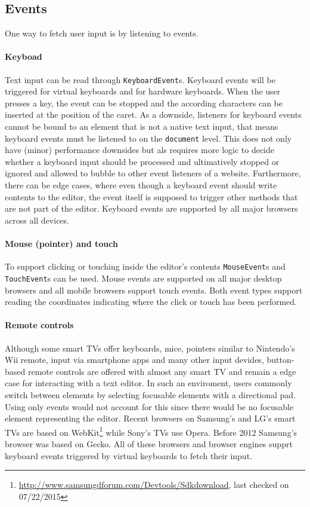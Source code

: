 \subsection{Events} 

One way to fetch user input is by listening to events.

\paragraph{Keyboad} Text input can be read through \texttt{KeyboardEvent}s. Keyboard events will be triggered for virtual keyboards and for hardware keyboards. When the user presses a key, the event can be stopped and the according characters can be inserted at the position of the caret. As a downside, listeners for keyboard events cannot be bound to an element that is not a native text input, that means keyboard events must be listened to on the \texttt{document} level. This does not only have (minor) performance downsides but als requires more logic to decide whether a keyboard input should be processed and ultimatively stopped or ignored and allowed to bubble to other event listeners of a website. Furthermore, there can be edge cases, where even though a keyboard event should write contents to the editor, the event itself is supposed to trigger other methods that are not part of the editor. Keyboard events are supported by all major browsers across all devices.

\paragraph{Mouse (pointer) and touch} To support clicking or touching inside the editor's contents \texttt{MouseEvent}s and \texttt{TouchEvent}s can be used. Mouse events are supported on all major desktop browsers and all mobile browsers support touch events. Both event types support reading the coordinates indicating where the click or touch has been performed.

\paragraph{Remote controls} Although some smart TVs offer keyboards, mice, pointers similar to Nintendo's Wii remote, input via smartphone apps and many other input devides, button-based remote controls are offered with almost any smart TV and remain a edge case for interacting with a text editor. In such an enviroment, users commonly switch between elements by selecting focusable elements with a directional pad. Using only events would not account for this since there would be no focusable element representing the editor. Recent browsers on Samsung's and LG's smart TVs are based on WebKit\footnote{\url{http://www.samsungdforum.com/Devtools/Sdkdownload}, last checked on 07/22/2015} while Sony's TVs use Opera. Before 2012 Samsung's browser was based on Gecko. All of these browsers and browser engines supprt keyboard events triggered by virtual keyboards to fetch their input.

